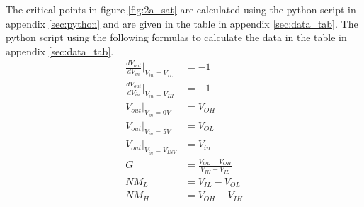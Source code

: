 \documentclass[titlepage, 12pt]{article}
\begin{document}
    The critical points in figure \ref{fig:2a_sat} are calculated using
    the python script in appendix \ref{sec:python} and are given in the
    table in appendix \ref{sec:data_tab}. The python script using the
    following formulas to calculate the data in the table in appendix
    \ref{sec:data_tab}.
    \begin{align}
        \frac{dV_{out}}{dV_{in}}\bigg|_{V_{in}=V_{IL}} &= -1\\
        \frac{dV_{out}}{dV_{in}}\bigg|_{V_{in}=V_{IH}} &= -1\\
        V_{out}\bigg|_{V_{in}= 0V} &= V_{OH}\\
        V_{out}\bigg|_{V_{in}= 5V} &= V_{OL}\\
        V_{out}\bigg|_{V_{in} = V_{INV}} &= V_{in}\\
        G &= \frac{V_{OL} - V_{OH}}{V_{IH} - V_{IL}}\\
        NM_L &= V_{IL} - V_{OL}\\
        NM_H &= V_{OH} - V_{IH}
    \end{align}
\end{document}
